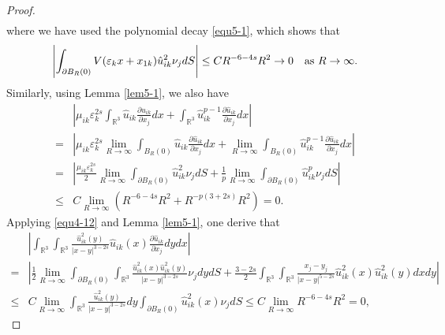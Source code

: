 \documentclass[reqno, 11pt]{amsart} %
\numberwithin{equation}{section}
\begin{document}
\begin{proof}
\begin{equation}
\begin{split}
			\end{split}
		\end{equation}
		where we have used the polynomial decay \eqref{equ5-1}, which shows that
		\begin{equation*}
			\left|\int_{ \partial B_{R}(0)}V(\varepsilon_{k}x+x_{1k})\hat{u}_{ik}^{2}\nu_{j} dS\right| \leq C R^{-6-4s}R^{2}\rightarrow0\quad \hbox{as $R\rightarrow\infty$}.
		\end{equation*}
		Similarly, using Lemma \ref{lem5-1}, we also have
		\begin{equation}\label{equ4-26}
			\begin{split}
				&	\left| \mu_{ik}\varepsilon_{k}^{2s}\int_{\mathbb{R}^{3}}\hat{u}_{ik}\frac{\partial\hat{u}_{ik}}{\partial x_{j}}dx+\int_{\mathbb{R}^{3}}\hat{u}_{ik}^{p-1}\frac{\partial\hat{u}_{ik}}{\partial x_{j}}dx\right| \\
				=&\left|\mu_{ik}\varepsilon_{k}^{2s}\lim_{R\rightarrow\infty}\int_{B_{R}(0)}\hat{u}_{ik}\frac{\partial\hat{u}_{ik}}{\partial x_{j}}dx+\lim_{R\rightarrow\infty}\int_{B_{R}(0)}\hat{u}_{ik}^{p-1}\frac{\partial\hat{u}_{ik}}{\partial x_{j}}dx \right| \\
				=&\left|\frac{\mu_{ik}\varepsilon_{k}^{2s}}{2}\lim_{R\rightarrow\infty}\int_{\partial B_{R}(0)}\hat{u}_{ik}^{2}\nu_{j}dS+\frac{1}{p}\lim_{R\rightarrow\infty}\int_{\partial B_{R}(0)}\hat{u}_{ik}^{p}\nu_{j}dS \right| \\
				\leq&C\lim_{R\rightarrow\infty}\left(R^{-6-4s} R^{2}+R^{-p(3+2s)}R^{2}\right) =0.
			\end{split}
		\end{equation}
		Applying \eqref{equ4-12} and Lemma \ref{lem5-1}, one derive that
		\begin{equation}\label{equ4-27}
			\begin{split}
				&	\left| \int_{\mathbb{R}^{3}}\int_{\mathbb{R}^{3}}\frac{\hat{u}_{ik}^{2}(y)}{|x-y|^{3-2s}}\hat{u}_{ik}(x)\frac{\partial\hat{u}_{ik}}{\partial x_{j}}dydx\right| \\
				=&\left| \frac{1}{2}\lim_{R\rightarrow\infty}\int_{ \partial B_{R}(0)}\int_{\mathbb{R}^{3}}\frac{\hat{u}^{2}_{ik}(x)\hat{u}^{2}_{ik}(y)}{|x-y|^{3-2s}}\nu_{j}dydS+\frac{3-2s}{2}	\int_{\mathbb{R}^{3}}\int_{\mathbb{R}^{3}}\frac{x_{j}-y_{j}}{|x-y|^{5-2s}}\hat{u}_{ik}^{2}(x)\hat{u}_{ik}^{2}(y)dxdy\right| \\
				\leq&C\lim_{R\rightarrow\infty}\int_{\mathbb{R}^{3}}\frac{\hat{u}^{2}_{ik}(y)}{|x-y|^{3-2s}}dy\int_{ \partial B_{R}(0)}\hat{u}^{2}_{ik}(x)\nu_{j}dS\leq C\lim_{R\rightarrow\infty}R^{-6-4s} R^{2}=0,

\end{split}
\end{equation}
\end{proof}
\end{document}
